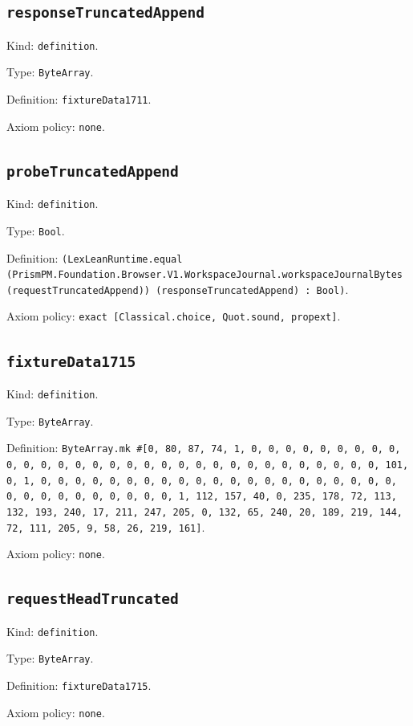 \documentclass[11pt]{article}
\begin{document}
\subsection*{\texttt{responseTruncatedAppend}}
\noindent Kind: \texttt{definition}.\par
\noindent Type: \texttt{ByteArray}.\par
\noindent Definition: \texttt{fixtureData1711}.\par
\noindent Axiom policy: \texttt{none}.\par
\subsection*{\texttt{probeTruncatedAppend}}
\noindent Kind: \texttt{definition}.\par
\noindent Type: \texttt{Bool}.\par
\noindent Definition: \texttt{(LexLeanRuntime.equal (PrismPM.Foundation.Browser.V1.WorkspaceJournal.workspaceJournalBytes (requestTruncatedAppend)) (responseTruncatedAppend) : Bool)}.\par
\noindent Axiom policy: \texttt{exact [Classical.choice, Quot.sound, propext]}.\par
\subsection*{\texttt{fixtureData1715}}
\noindent Kind: \texttt{definition}.\par
\noindent Type: \texttt{ByteArray}.\par
\noindent Definition: \texttt{ByteArray.mk \#[0, 80, 87, 74, 1, 0, 0, 0, 0, 0, 0, 0, 0, 0, 0, 0, 0, 0, 0, 0, 0, 0, 0, 0, 0, 0, 0, 0, 0, 0, 0, 0, 0, 0, 0, 0, 101, 0, 1, 0, 0, 0, 0, 0, 0, 0, 0, 0, 0, 0, 0, 0, 0, 0, 0, 0, 0, 0, 0, 0, 0, 0, 0, 0, 0, 0, 0, 0, 0, 0, 1, 112, 157, 40, 0, 235, 178, 72, 113, 132, 193, 240, 17, 211, 247, 205, 0, 132, 65, 240, 20, 189, 219, 144, 72, 111, 205, 9, 58, 26, 219, 161]}.\par
\noindent Axiom policy: \texttt{none}.\par
\subsection*{\texttt{requestHeadTruncated}}
\noindent Kind: \texttt{definition}.\par
\noindent Type: \texttt{ByteArray}.\par
\noindent Definition: \texttt{fixtureData1715}.\par
\noindent Axiom policy: \texttt{none}.\par
\end{document}
